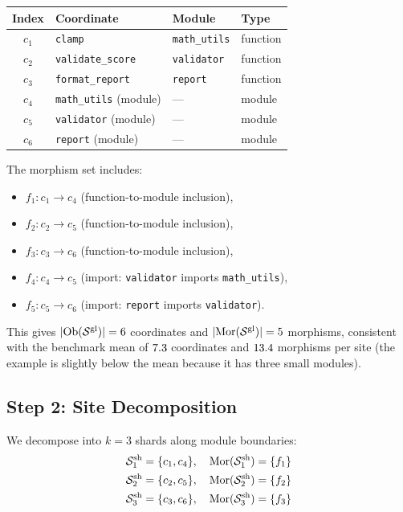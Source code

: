 \documentclass[11pt]{article}
\newcommand{\ShardSite}{\mathcal{S}^{\mathrm{sh}}}
\newcommand{\GlobalSite}{\mathcal{S}^{\mathrm{gl}}}
\begin{document}
\begin{center}
\small
\begin{tabular}{clll}
\toprule
\textbf{Index} & \textbf{Coordinate} & \textbf{Module} & \textbf{Type} \\
\midrule
$c_1$ & \texttt{clamp} & \texttt{math\_utils} & function \\
$c_2$ & \texttt{validate\_score} & \texttt{validator} & function \\
$c_3$ & \texttt{format\_report} & \texttt{report} & function \\
$c_4$ & \texttt{math\_utils} (module) & --- & module \\
$c_5$ & \texttt{validator} (module) & --- & module \\
$c_6$ & \texttt{report} (module) & --- & module \\
\bottomrule
\end{tabular}
\end{center}

The morphism set includes:
\begin{itemize}[noitemsep]
  \item $f_1\colon c_1 \to c_4$ (function-to-module inclusion),
  \item $f_2\colon c_2 \to c_5$ (function-to-module inclusion),
  \item $f_3\colon c_3 \to c_6$ (function-to-module inclusion),
  \item $f_4\colon c_4 \to c_5$ (import: \texttt{validator} imports
        \texttt{math\_utils}),
  \item $f_5\colon c_5 \to c_6$ (import: \texttt{report} imports
        \texttt{validator}).
\end{itemize}

This gives $|\Ob(\GlobalSite)| = 6$ coordinates and
$|\Mor(\GlobalSite)| = 5$ morphisms, consistent with the benchmark
mean of $7.3$ coordinates and $13.4$
morphisms per site (the example is slightly below the mean because it
has three small modules).

\subsection{Step 2: Site Decomposition}

We decompose into $k = 3$ shards along module boundaries:
\begin{align*}
  \ShardSite_1 &= \{c_1, c_4\}, \quad \Mor(\ShardSite_1) = \{f_1\} \\
  \ShardSite_2 &= \{c_2, c_5\}, \quad \Mor(\ShardSite_2) = \{f_2\} \\
  \ShardSite_3 &= \{c_3, c_6\}, \quad \Mor(\ShardSite_3) = \{f_3\}
\end{align*}
\end{document}
